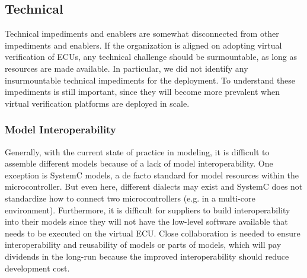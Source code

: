 \subsection{Technical}
Technical impediments and enablers are somewhat disconnected from other impediments and enablers.
If the organization is aligned on adopting virtual verification of ECUs,
any technical challenge should be surmountable, as long as resources are made available.
In particular, we did not identify any insurmountable technical impediments for the deployment.
To understand these impediments is still important, since they will become more prevalent when virtual verification platforms are deployed in scale.

\subsubsection{Model Interoperability}
Generally, with the current state of practice in modeling, it is difficult to assemble different models because of a lack of model interoperability. One exception is SystemC models, a de facto standard for model resources within the microcontroller. But even here, different dialects may exist and SystemC does not standardize how to connect two microcontrollers (e.g. in a multi-core environment). Furthermore, it is difficult for suppliers to build interoperability into their models since they will not have the low-level software available that needs to be executed on the virtual ECU. Close collaboration is needed to ensure interoperability and reusability of models or parts of models, which will pay dividends in the long-run because the improved interoperability should reduce development cost.


